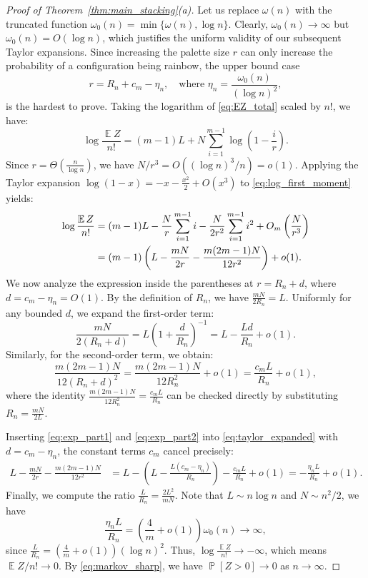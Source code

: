 \documentclass[11pt,reqno]{amsart}
\theoremstyle{definition}
\theoremstyle{remark}
\newcommand\E{\operatorname{\mathbb{E}}}
\renewcommand\Pr{\operatorname{\mathbb{P}}}
\renewcommand\to{\rightarrow}
\begin{document}
\begin{proof}[Proof of Theorem~\ref{thm:main_stacking}\textup{(a)}]
Let us replace $\omega(n)$ with the truncated function $\omega_0(n) = \min\{\omega(n), \log n\}$. Clearly, $\omega_0(n) \to \infty$ but $\omega_0(n) = O(\log n)$, which justifies the uniform validity of our subsequent Taylor expansions. Since increasing the palette size $r$ can only increase the probability of a configuration being rainbow, the upper bound case 
\[ r = R_n + c_m - \eta_n, \quad \text{where } \eta_n = \frac{\omega_0(n)}{(\log n)^2}, \]
is the hardest to prove. Taking the logarithm of \eqref{eq:EZ_total} scaled by $n!$, we have:
\begin{equation} \label{eq:log_first_moment}
\log \frac{\E Z}{n!} = (m-1)L + N \sum_{i=1}^{m-1} \log\left(1 - \frac{i}{r}\right).
\end{equation}
Since $r = \Theta\left(\frac{n}{\log n}\right)$, we have $N/r^3 = O((\log n)^3 / n) = o(1)$. Applying the Taylor expansion $\log(1-x) = -x - \frac{x^2}{2} + O(x^3)$ to \eqref{eq:log_first_moment} yields:
\begin{align}
\log \frac{\E Z}{n!} &= (m-1)L - \frac{N}{r}\sum_{i=1}^{m-1} i - \frac{N}{2r^2}\sum_{i=1}^{m-1} i^2 + O_m\left(\frac{N}{r^3}\right) \notag \\
&= (m-1)\left(L - \frac{mN}{2r} - \frac{m(2m-1)N}{12r^2}\right) + o(1). \label{eq:taylor_expanded}
\end{align}
We now analyze the expression inside the parentheses at $r = R_n + d$, where $d = c_m - \eta_n = O(1)$. By the definition of $R_n$, we have $\frac{mN}{2R_n} = L$. Uniformly for any bounded $d$, we expand the first-order term:
\begin{equation} \label{eq:exp_part1}
\frac{mN}{2(R_n + d)} = L \left(1 + \frac{d}{R_n}\right)^{-1} = L - \frac{Ld}{R_n} + o(1).
\end{equation}
Similarly, for the second-order term, we obtain:
\begin{equation} \label{eq:exp_part2}
\frac{m(2m-1)N}{12(R_n+d)^2} = \frac{m(2m-1)N}{12R_n^2} + o(1) = \frac{c_m L}{R_n} + o(1),
\end{equation}
where the identity $\frac{m(2m-1)N}{12R_n^2} = \frac{c_m L}{R_n}$ can be checked directly by substituting $R_n = \frac{mN}{2L}$. 

Inserting \eqref{eq:exp_part1} and \eqref{eq:exp_part2} into \eqref{eq:taylor_expanded} with $d = c_m - \eta_n$, the constant terms $c_m$ cancel precisely:
\begin{align*}
L - \frac{mN}{2r} - \frac{m(2m-1)N}{12r^2} &= L - \left(L - \frac{L(c_m - \eta_n)}{R_n}\right) - \frac{c_m L}{R_n} + o(1)= -\frac{\eta_n L}{R_n} + o(1).
\end{align*}
Finally, we compute the ratio $\frac{L}{R_n} = \frac{2L^2}{mN}$. Note that $L \sim n\log n$ and $N \sim n^2/2$, we have
\[ \frac{\eta_n L}{R_n} = \left(\frac{4}{m} + o(1)\right) \omega_0(n) \to \infty, \]
since $\frac{L}{R_n} = \left(\frac{4}{m} + o(1)\right) (\log n)^2$. Thus, $\log \frac{\E Z}{n!} \to -\infty$, which means $\E Z / n! \to 0$. By \eqref{eq:markov_sharp}, we have $\Pr[Z > 0] \to 0$ as $n \to \infty$.
\end{proof}
\end{document}
